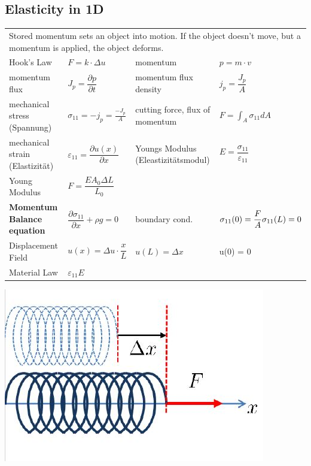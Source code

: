 \subsection{Elasticity in 1D}
\renewcommand{\arraystretch}{2.2}
	\begin{tabularx}{ \columnwidth} {p{3cm}XlX}
		\hline 
		\multicolumn{4}{p{\columnwidth}}{Stored momentum sets an object into motion. If the object doesn't move, but a momentum is applied, the object deforms.}\\
		Hook's Law & $F = k\cdot \Delta u$ &
		momentum   & $p = m\cdot v$\\
		
		momentum flux & $J_p = \dfrac{\partial p}{\partial t}$&
		momentum flux density & $j_p = \dfrac{J_p}{A}$\\
		
		mechanical stress (Spannung) & $\sigma_{11} = -j_p = \frac{-J_p}{A} $ &
		cutting force, flux of momentum & $F = \int_A \sigma_{11} dA$\\
		mechanical strain (Elastizität) &$\varepsilon_{11} = \dfrac{\partial u(x)}{\partial x}$&
		Youngs Modulus (Eleastizitätsmodul) &  $E = \dfrac{\sigma_{11}}{\varepsilon_{11}} $\\		
		Young Modulus & $F = \dfrac{EA_0\Delta L}{L_0}$&&\\
		\hline 
		\textbf{Momentum Balance equation} & $\dfrac{\partial \sigma_{11}}{\partial x} + \rho g= 0$ &
		boundary cond. & $\sigma_{11}(0) = \dfrac{F}{A} \newline  \sigma_{11}(L) = 0$ \\
		
		Displacement Field & $u(x) = \Delta u \cdot \dfrac{x}{L}$ & 
		$u(L) = \Delta x$ &  u(0) = 0 \\
		Material Law & $\varepsilon_{11}$\newline $ E $\\ 
		
	\end{tabularx}
\renewcommand{\arraystretch}{1.2}	
	 \includegraphics[scale = 0.3]{images/hook}
